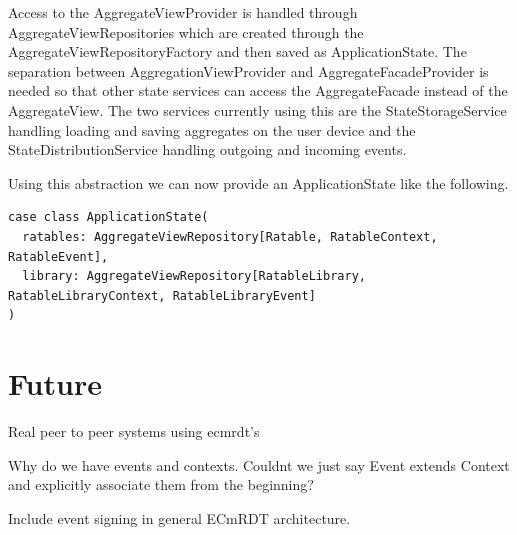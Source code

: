 \documentclass[
	ngerman,
	ruledheaders=section,   %
	class=report,		    %
	thesis={type=bachelor}, %
	accentcolor=9c,			%
	custommargins=true,    %
	marginpar=false,        %
	parskip=half-,          %
	fontsize=11pt,          %
]{tudapub}
\begin{document}
Access to the AggregateViewProvider is handled through AggregateViewRepositories which are created through the AggregateViewRepositoryFactory and then saved as ApplicationState. The separation between AggregationViewProvider and AggregateFacadeProvider is needed so that other state services can access the AggregateFacade instead of the AggregateView. The two services currently using this are the StateStorageService handling loading and saving aggregates on the user device and the StateDistributionService handling outgoing and incoming events. 

Using this abstraction we can now provide an ApplicationState like the following.

\begin{lstlisting}
case class ApplicationState(
  ratables: AggregateViewRepository[Ratable, RatableContext, RatableEvent],
  library: AggregateViewRepository[RatableLibrary, RatableLibraryContext, RatableLibraryEvent]
)
\end{lstlisting}

\chapter{Future}
Real peer to peer systems using ecmrdt's

Why do we have events and contexts. Couldnt we just say Event extends Context and explicitly associate them from the beginning?

Include event signing in general ECmRDT architecture.
\end{document}
